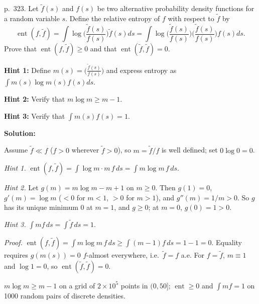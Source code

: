 \documentclass[12pt, letterpaper]{article}
\newcommand{\ent}{\operatorname{ent}}
\begin{document}
\begin{tcolorbox}[oddbox,title={Exercise 8.21 \quad Entropy}]
\begin{tcolorbox}[questionbox]
p.~323. Let $\tilde f(s)$ and $f(s)$ be two alternative probability density functions for a random variable $s$.
Define the relative entropy of $f$ with respect to $\tilde f$ by
\[
\ent(f,\tilde f)=\int\log\Big(\frac{\tilde f(s)}{f(s)}\Big)\tilde f(s)ds=\int\log\Big(\frac{\tilde f(s)}{f(s)}\Big)\Big(\frac{\tilde f(s)}{f(s)}\Big)f(s)ds.
\]
Prove that $\ent(f,\tilde f)\ge0$ and that $\ent(\tilde f,\tilde f)=0$.

\textbf{Hint 1:} Define $m(s)=\big(\frac{\tilde f(s)}{f(s)}\big)$ and express entropy as $\int m(s)\log m(s)f(s)ds$.

\textbf{Hint 2:} Verify that $m\log m\ge m-1$.

\textbf{Hint 3:} Verify that $\int m(s)f(s)=1$.
\end{tcolorbox}

\textbf{Solution:}

Assume $\tilde f\ll f$ ($f>0$ wherever $\tilde f>0$), so $m=\tilde f/f$ is well defined; set $0\log0=0$.

\emph{Hint 1.} $\ent(f,\tilde f)=\int\log m\cdot m\,f\,ds=\int m\log m\,f\,ds$.

\emph{Hint 2.} Let $g(m)=m\log m-m+1$ on $m\ge0$. Then $g(1)=0$, $g'(m)=\log m$ ($<0$ for $m<1$, $>0$ for $m>1$), and
$g''(m)=1/m>0$. So $g$ has its unique minimum $0$ at $m=1$, and $g\ge0$; at $m=0$, $g(0)=1>0$.

\emph{Hint 3.} $\int mf\,ds=\int\tilde f\,ds=1$.

\emph{Proof.} $\ent(f,\tilde f)=\int m\log m\,f\,ds\ge\int(m-1)f\,ds=1-1=0$. Equality requires $g(m(s))=0$
$f$-almost everywhere, i.e.\ $\tilde f=f$ a.e. For $f=\tilde f$, $m\equiv1$ and $\log1=0$, so
$\ent(\tilde f,\tilde f)=0$.

\begin{tcolorbox}[databox]
$m\log m\ge m-1$ on a grid of $2\times10^5$ points in $(0,50]$; $\ent\ge0$ and $\int mf=1$ on 1000 random pairs of
discrete densities.
\end{tcolorbox}
\end{tcolorbox}
\end{document}
